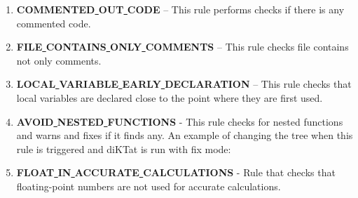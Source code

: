 \begin{enumerate}
    \item \textbf{COMMENTED\underline{ }OUT\underline{ }CODE} – This rule performs checks if there is any commented code.
    \item \textbf{FILE\underline{ }CONTAINS\underline{ }ONLY\underline{ }COMMENTS} – This rule checks file contains not only comments.
    \item \textbf{LOCAL\underline{ }VARIABLE\underline{ }EARLY\underline{ }DECLARATION} – This rule checks that local variables are declared close to the point where they are first used.
    \item \textbf{AVOID\underline{ }NESTED\underline{ }FUNCTIONS} - This rule checks for nested functions and warns and fixes if it finds any. An example of changing the tree when this rule is triggered and diKTat is run with fix mode:\\
    \item \textbf{FLOAT\underline{ }IN\underline{ }ACCURATE\underline{ }CALCULATIONS} - Rule that checks that floating-point numbers are not used for accurate calculations.
\end{enumerate}
